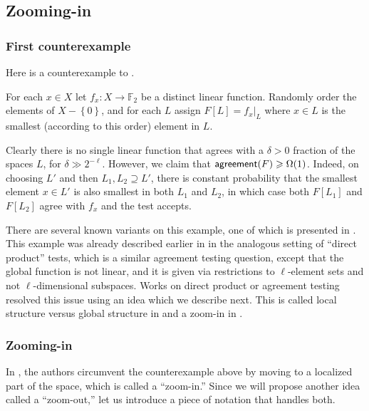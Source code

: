 \documentclass{toc}
\newcommand\set[1]{{\left\{ #1 \right\}}}
\renewcommand\ge{\geqslant}
\renewcommand\supset{\supseteq}
\def\F{\mathbb{F}}
\def\agr{{\sf agreement}}
\begin{document}
\subsection{Zooming-in}\label{sec:counter-1}
%
\subsubsection*{First counterexample}  %
Here is a counterexample to .

%
For each $x\in X$ let $f_x:X\to\F_2$ be a distinct linear function. Randomly order the elements of $X-\set 0$, and for each $L$ assign $F[L] = f_x|_L$ where $x\in L$ is the smallest (according to this order) element in $L$.

Clearly there is no single linear function that agrees with
a %
$\delta>0$ fraction of the spaces $L$, for $\delta \gg 2^{-\ell}$. However, we claim that $\agr(F) \ge \Omega(1)$. Indeed, on choosing $L'$ and then $L_1,L_2\supset L'$, there is constant probability that the smallest element $x\in L'$ is also smallest in both $L_1$ and $L_2$, in which case both $F[L_1]$ and $F[L_2]$ agree with $f_x$ and the test accepts.

\begin{remark}
There are several known variants on this example, one of which is presented in \cite{KMS}. This example was already described earlier in  \cite{DG08} in the analogous setting of ``direct product'' tests, which is a similar agreement testing question, except that the global function is not linear, and it is given via restrictions to $\ell$-element sets and not $\ell$-dimensional subspaces. Works on direct product or agreement testing \cite{IKW,DS14} resolved this issue using an idea which we describe next. This is called local structure versus global structure in \cite {IKW,DS14} and a zoom-in in \cite{KMS}.
\end{remark}


\subsubsection*{Zooming-in}

In \cite{KMS}, the authors circumvent the counterexample above by
moving to a localized part of the space, which is called a
``zoom-in.'' Since we will propose another idea called a ``zoom-out,''
let us introduce a piece of notation that handles both.
\end{document}
